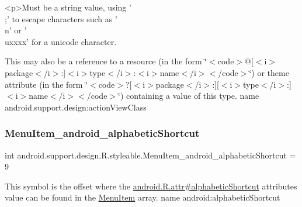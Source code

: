 \begin{DoxyVerb}      <p>Must be a string value, using '\\;' to escape characters such as '\\n' or '\\uxxxx' for a unicode character.
\end{DoxyVerb}
 

This may also be a reference to a resource (in the form \char`\"{}$<$code$>$@\mbox{[}$<$i$>$package$<$/i$>$\+:\mbox{]}$<$i$>$type$<$/i$>$\+:$<$i$>$name$<$/i$>$$<$/code$>$\char`\"{}) or theme attribute (in the form \char`\"{}$<$code$>$?\mbox{[}$<$i$>$package$<$/i$>$\+:\mbox{]}\mbox{[}$<$i$>$type$<$/i$>$\+:\mbox{]}$<$i$>$name$<$/i$>$$<$/code$>$\char`\"{}) containing a value of this type.  name android.\+support.\+design\+:action\+View\+Class \mbox{\label{classandroid_1_1support_1_1design_1_1R_1_1styleable_a1086898c8f2f36e911f6252adae34a8b}} 
\subsubsection{\texorpdfstring{Menu\+Item\+\_\+android\+\_\+alphabetic\+Shortcut}{MenuItem\_android\_alphabeticShortcut}}
{\footnotesize\ttfamily int android.\+support.\+design.\+R.\+styleable.\+Menu\+Item\+\_\+android\+\_\+alphabetic\+Shortcut = 9\hspace{0.3cm}{\ttfamily [static]}}

This symbol is the offset where the \hyperlink{}{android.\+R.\+attr\#alphabetic\+Shortcut} attribute\textquotesingle{}s value can be found in the \hyperlink{classandroid_1_1support_1_1design_1_1R_1_1styleable_a4c90afdbb461f2bfba191da26fbc881c}{Menu\+Item} array.  name android\+:alphabetic\+Shortcut \mbox{\label{classandroid_1_1support_1_1design_1_1R_1_1styleable_ae1065c880977606a130948ccb5422e36}} 
